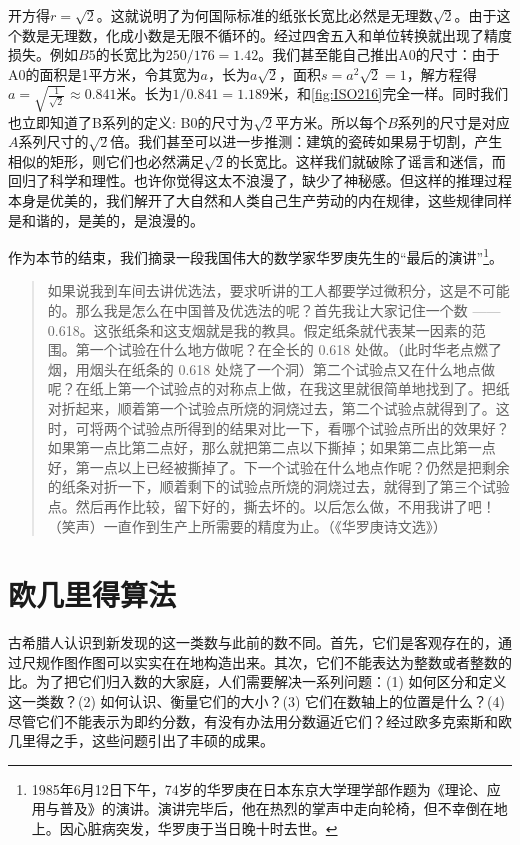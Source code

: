 \documentclass[b5paper]{ctexart}
\begin{document}
开方得$r = \sqrt{2}$。这就说明了为何国际标准的纸张长宽比必然是无理数$\sqrt{2}$。由于这个数是无理数，化成小数是无限不循环的。经过四舍五入和单位转换就出现了精度损失。例如$B5$的长宽比为$250/176 = 1.42$。我们甚至能自己推出A0的尺寸：由于A0的面积是1平方米，令其宽为$a$，长为$a\sqrt{2}$，面积$s = a^2\sqrt{2} = 1$，解方程得$a = \sqrt{\frac{1}{\sqrt{2}}} \approx 0.841$米。长为$1 / 0.841 = 1.189$米，和\cref{fig:ISO216}完全一样。同时我们也立即知道了B系列的定义: B0的尺寸为$\sqrt{2}$平方米。所以每个$B$系列的尺寸是对应$A$系列尺寸的$\sqrt{2}$倍。我们甚至可以进一步推测：建筑的瓷砖如果易于切割，产生相似的矩形，则它们也必然满足$\sqrt{2}$的长宽比。这样我们就破除了谣言和迷信，而回归了科学和理性。也许你觉得这太不浪漫了，缺少了神秘感。但这样的推理过程本身是优美的，我们解开了大自然和人类自己生产劳动的内在规律，这些规律同样是和谐的，是美的，是浪漫的。

 
作为本节的结束，我们摘录一段我国伟大的数学家华罗庚先生的“最后的演讲”\footnote{1985年6月12日下午，74岁的华罗庚在日本东京大学理学部作题为《理论、应用与普及》的演讲。演讲完毕后，他在热烈的掌声中走向轮椅，但不幸倒在地上。因心脏病突发，华罗庚于当日晚十时去世。}。

\begin{quotation}
如果说我到车间去讲优选法，要求听讲的工人都要学过微积分，这是不可能的。那么我是怎么在中国普及优选法的呢？首先我让大家记住一个数 ——0.618。这张纸条和这支烟就是我的教具。假定纸条就代表某一因素的范围。第一个试验在什么地方做呢？在全长的 0.618 处做。（此时华老点燃了烟，用烟头在纸条的 0.618 处烧了一个洞）第二个试验点又在什么地点做呢？在纸上第一个试验点的对称点上做，在我这里就很简单地找到了。把纸对折起来，顺着第一个试验点所烧的洞烧过去，第二个试验点就得到了。这时，可将两个试验点所得到的结果对比一下，看哪个试验点所出的效果好？如果第一点比第二点好，那么就把第二点以下撕掉；如果第二点比第一点好，第一点以上已经被撕掉了。下一个试验在什么地点作呢？仍然是把剩余的纸条对折一下，顺着剩下的试验点所烧的洞烧过去，就得到了第三个试验点。然后再作比较，留下好的，撕去坏的。以后怎么做，不用我讲了吧！（笑声）一直作到生产上所需要的精度为止。（《华罗庚诗文选》）
\end{quotation}

\section{欧几里得算法}
\label{sec:Euclidean-algorithm}

古希腊人认识到新发现的这一类数与此前的数不同。首先，它们是客观存在的，通过尺规作图作图可以实实在在地构造出来。其次，它们不能表达为整数或者整数的比。为了把它们归入数的大家庭，人们需要解决一系列问题：(1) 如何区分和定义这一类数？(2) 如何认识、衡量它们的大小？(3) 它们在数轴上的位置是什么？(4) 尽管它们不能表示为即约分数，有没有办法用分数逼近它们？经过欧多克索斯和欧几里得之手，这些问题引出了丰硕的成果。
\end{document}
